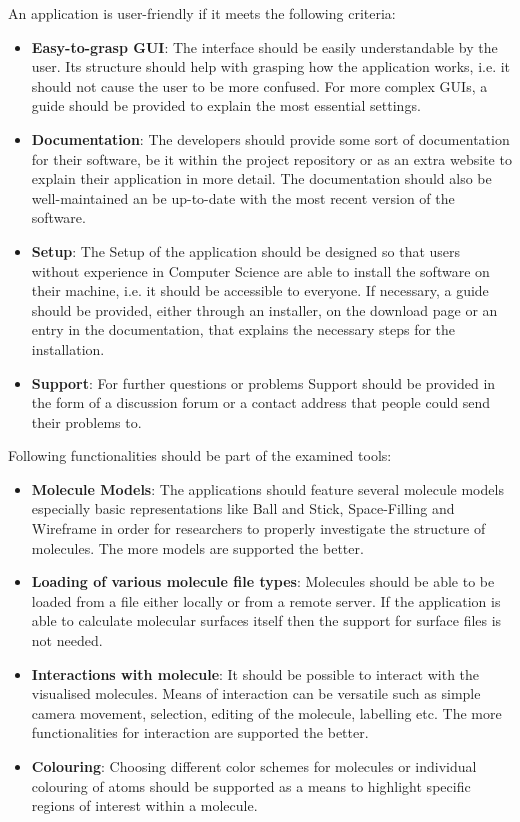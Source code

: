 An application is user-friendly if it meets the following criteria: 
\begin{itemize}
	\item \textbf{Easy-to-grasp GUI}: The interface should be easily understandable by the user. Its structure should help with grasping how the application works, i.e. it should not cause the user to be more confused. For more complex GUIs, a guide should be provided to explain the most essential settings.
	\item \textbf{Documentation}: The developers should provide some sort of documentation for their software, be it within the project repository or as an extra website to explain their application in more detail. The documentation should also be well-maintained an be up-to-date with the most recent version of the software.
	\item \textbf{Setup}: The Setup of the application should be designed so that users without experience in Computer Science are able to install the software on their machine, i.e. it should be accessible to everyone. If necessary, a guide should be provided, either through an installer, on the download page or an entry in the documentation, that explains the necessary steps for the installation.
	\item \textbf{Support}: For further questions or problems Support should be provided in the form of a discussion forum or a contact address that people could send their problems to. 
\end{itemize}

Following functionalities should be part of the examined tools:
\begin{itemize}
	\item \textbf{Molecule Models}: The applications should feature several molecule models especially basic representations like Ball and Stick, Space-Filling and Wireframe in order for researchers to properly investigate the structure of molecules. The more models are supported the better.
	\item \textbf{Loading of various molecule file types}: Molecules should be able to be loaded from a file either locally or from a remote server. If the application is able to calculate molecular surfaces itself then the support for surface files is not needed. 
	\item \textbf{Interactions with molecule}: It should be possible to interact with the visualised molecules. Means of interaction can be versatile such as simple camera movement, selection, editing of the molecule, labelling etc. The more functionalities for interaction are supported the better.
	\item \textbf{Colouring}: Choosing different color schemes for molecules or individual colouring of atoms should be supported as a means to highlight specific regions of interest within a molecule.
\end{itemize}

